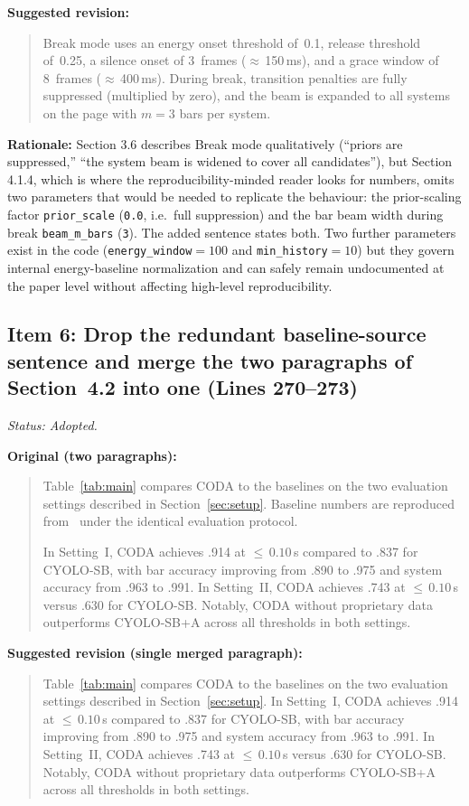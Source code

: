 \documentclass{article}
\begin{document}
\textbf{Suggested revision:}
\begin{quote}
Break mode uses an energy onset threshold of~0.1, release threshold of~0.25, a silence onset of 3~frames ($\approx$\,150\,ms), and a grace window of 8~frames ($\approx$\,400\,ms). During break, transition penalties are fully suppressed (multiplied by zero), and the beam is expanded to all systems on the page with $m{=}3$ bars per system.
\end{quote}

\textbf{Rationale:}
Section 3.6 describes Break mode qualitatively (``priors are suppressed,'' ``the system beam is widened to cover all candidates''), but Section 4.1.4, which is where the reproducibility-minded reader looks for numbers, omits two parameters that would be needed to replicate the behaviour: the prior-scaling factor \texttt{prior\_scale} (\texttt{0.0}, i.e.\ full suppression) and the bar beam width during break \texttt{beam\_m\_bars} (\texttt{3}). The added sentence states both. Two further parameters exist in the code (\texttt{energy\_window}$=100$ and \texttt{min\_history}$=10$) but they govern internal energy-baseline normalization and can safely remain undocumented at the paper level without affecting high-level reproducibility.

\subsection*{Item 6: Drop the redundant baseline-source sentence and merge the two paragraphs of Section~4.2 into one (Lines 270--273)}

\textit{Status: Adopted.}

\textbf{Original (two paragraphs):}
\begin{quote}
Table~\ref{tab:main} compares CODA to the baselines on the two evaluation settings described in Section~\ref{sec:setup}. Baseline numbers are reproduced from~\cite{henkel2021real} under the identical evaluation protocol.

In Setting~I, CODA achieves .914 at ${\leq}\,0.10$\,s compared to .837 for CYOLO-SB, with bar accuracy improving from .890 to .975 and system accuracy from .963 to .991. In Setting~II, CODA achieves .743 at ${\leq}\,0.10$\,s versus .630 for CYOLO-SB. Notably, CODA without proprietary data outperforms CYOLO-SB+A across all thresholds in both settings.
\end{quote}

\textbf{Suggested revision (single merged paragraph):}
\begin{quote}
Table~\ref{tab:main} compares CODA to the baselines on the two evaluation settings described in Section~\ref{sec:setup}. In Setting~I, CODA achieves .914 at ${\leq}\,0.10$\,s compared to .837 for CYOLO-SB, with bar accuracy improving from .890 to .975 and system accuracy from .963 to .991. In Setting~II, CODA achieves .743 at ${\leq}\,0.10$\,s versus .630 for CYOLO-SB. Notably, CODA without proprietary data outperforms CYOLO-SB+A across all thresholds in both settings.
\end{quote}
\end{document}
